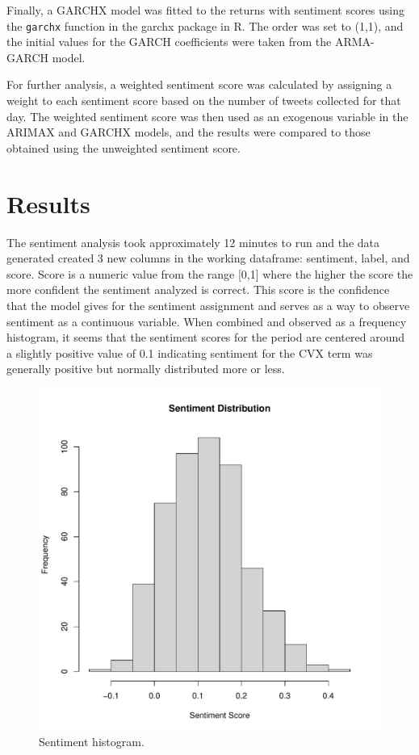 \documentclass[12pt, letterpaper, titlepage]{article}
\begin{document}
Finally, a GARCHX model was fitted to the returns with sentiment scores using the \texttt{garchx} function in the garchx package in R. The order was set to (1,1), and the initial values for the GARCH coefficients were taken from the ARMA-GARCH model.

For further analysis, a weighted sentiment score was calculated by assigning a weight to each sentiment score based on the number of tweets collected for that day. The weighted sentiment score was then used as an exogenous variable in the ARIMAX and GARCHX models, and the results were compared to those obtained using the unweighted sentiment score.

\section{Results}
\label{sec:results}

The sentiment analysis took approximately 12 minutes to run and the data generated created 3 new columns in the working dataframe: sentiment, label, and score. Score is a numeric value from the range [0,1] where the higher the score the more confident the sentiment analyzed is correct. This score is the confidence that the model gives for the sentiment assignment and serves as a way to observe sentiment as a continuous variable. When combined and observed as a frequency histogram, it seems that the sentiment scores for the period are centered around a slightly positive value of 0.1 indicating sentiment for the CVX term was generally positive but normally distributed more or less.


\begin{figure}[tbp]
  \begin{center}
  \includegraphics[width=\textwidth]{../figures/fig3.pdf}
  \caption{Sentiment histogram.}\label{fig:sentimenthist}
  \end{center}
\end{figure}
\end{document}
